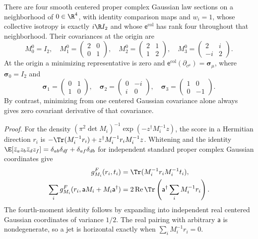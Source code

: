 There are four smooth centered proper complex Gaussian law sections on a neighborhood of
\(0\in\R^4\), with identity comparison maps and \(w_i=1\), whose collective isotropy is exactly
\(i\R I_2\) and whose \(\mathsf e^{\mathrm{col}}\) has rank four throughout that neighborhood.
Their covariances at the origin are
\begin{equation}
M_0^0=I_2,\quad M_1^0=\begin{pmatrix}2&0\\0&1\end{pmatrix},\quad
M_2^0=\begin{pmatrix}2&1\\1&2\end{pmatrix},\quad
M_3^0=\begin{pmatrix}2&i\\-i&2\end{pmatrix}.
\label{eq:pb-collective-gaussian-values}
\end{equation}
At the origin a minimizing representative is zero and
\(\mathsf e^{\mathrm{col}}(\partial_{c^\mu})=\boldsymbol\sigma_\mu\), where
\(\boldsymbol\sigma_0=I_2\) and
\begin{equation}
\boldsymbol\sigma_1=\begin{pmatrix}0&1\\1&0\end{pmatrix},\quad
\boldsymbol\sigma_2=\begin{pmatrix}0&-i\\i&0\end{pmatrix},\quad
\boldsymbol\sigma_3=\begin{pmatrix}1&0\\0&-1\end{pmatrix}.
\label{eq:pb-collective-pauli-basis}
\end{equation}
By contrast, minimizing from one centered Gaussian covariance alone always gives zero covariant
derivative of that covariance. 

\noindent\emph{Proof.}
For the density \((\pi^2\det M_i)^{-1}\exp(-z^\dagger M_i^{-1}z)\), the score in a Hermitian
direction \(r_i\) is \(-\Tr(M_i^{-1}r_i)+z^\dagger M_i^{-1}r_iM_i^{-1}z\). Whitening and the
identity \(\E[\bar z_a z_b\bar z_d z_f]=\delta_{ab}\delta_{df}+\delta_{af}\delta_{db}\)
for independent standard proper complex Gaussian coordinates give
\begin{equation}
\begin{aligned}
g^F_{M_i}(r_i,t_i)&=\Tr(M_i^{-1}r_iM_i^{-1}t_i),\\
\sum_i g^F_{M_i}(r_i,\mathsf aM_i+M_i\mathsf a^\dagger)
&=2\operatorname{Re}\Tr\left(\mathsf a^\dagger\sum_iM_i^{-1}r_i\right).
\end{aligned}
\label{eq:pb-collective-gaussian-normal}
\end{equation}
The fourth-moment identity follows by expanding into independent real centered Gaussian
coordinates of variance \(1/2\). The real pairing with arbitrary \(\mathsf a\) is nondegenerate,
so a jet is horizontal exactly when \(\sum_iM_i^{-1}r_i=0\).

